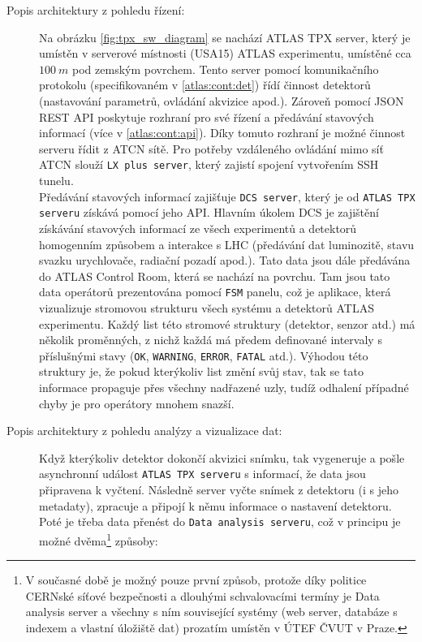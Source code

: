 \begin{description}
	\item[Popis architektury z pohledu řízení:] 
		Na obrázku \ref{fig:tpx_sw_diagram} se nachází ATLAS TPX server, který je umístěn v serverové místnosti (USA15) ATLAS experimentu, umístěné cca $100~m$ pod zemským povrchem. Tento server pomocí komunikačního protokolu (specifikovaném v \ref{atlas:cont:det}) řídí činnost detektorů (nastavování parametrů, ovládání akvizice apod.). Zároveň pomocí JSON REST API poskytuje rozhraní pro své řízení a předávání stavových informací (více v \ref{atlas:cont:api}). Díky tomuto rozhraní je možné činnost serveru řídit z ATCN sítě. Pro potřeby vzdáleného ovládání mimo síť ATCN slouží \texttt{LX plus server}, který zajistí spojení vytvořením SSH tunelu.\\
		Předávání stavových informací zajišťuje \texttt{DCS server}, který je od \texttt{ATLAS TPX serveru} získává pomocí jeho API. Hlavním úkolem DCS je zajištění získávání stavových informací ze všech experimentů a detektorů homogenním způsobem a interakce s LHC (předávání dat luminozitě, stavu svazku urychlovače, radiační pozadí apod.). Tato data jsou dále předávána do ATLAS Control Room, která se nachází na povrchu. Tam jsou tato data operátorů prezentována pomocí \texttt{FSM} panelu, což je aplikace, která vizualizuje stromovou strukturu všech systému a detektorů ATLAS experimentu. Každý list této stromové struktury (detektor, senzor atd.) má několik proměnných, z nichž každá má předem definované intervaly s příslušnými stavy (\texttt{OK}, \texttt{WARNING}, \texttt{ERROR}, \texttt{FATAL} atd.). Výhodou této struktury je, že pokud kterýkoliv list změní svůj stav, tak se tato informace propaguje přes všechny nadřazené uzly, tudíž odhalení případné chyby je pro operátory mnohem snazší.
	\item[Popis architektury z pohledu analýzy a vizualizace dat:] 
		Když kterýkoliv detektor dokončí akvizici snímku, tak vygeneruje a pošle asynchronní událost \texttt{ATLAS TPX serveru} s informací, že data jsou připravena k vyčtení. Následně server vyčte snímek z detektoru (i s jeho metadaty), zpracuje a připojí k němu informace o nastavení detektoru. Poté je třeba data přenést do \texttt{Data analysis serveru}, což v principu je možné dvěma\footnote{V současné době je možný pouze první způsob, protože díky politice CERNské síťové bezpečnosti a dlouhými schvalovacími termíny je Data analysis server a všechny s ním související systémy (web server, databáze s indexem a vlastní úložiště dat) prozatím umístěn v ÚTEF ČVUT v Praze.} způsoby:

\end{description}
